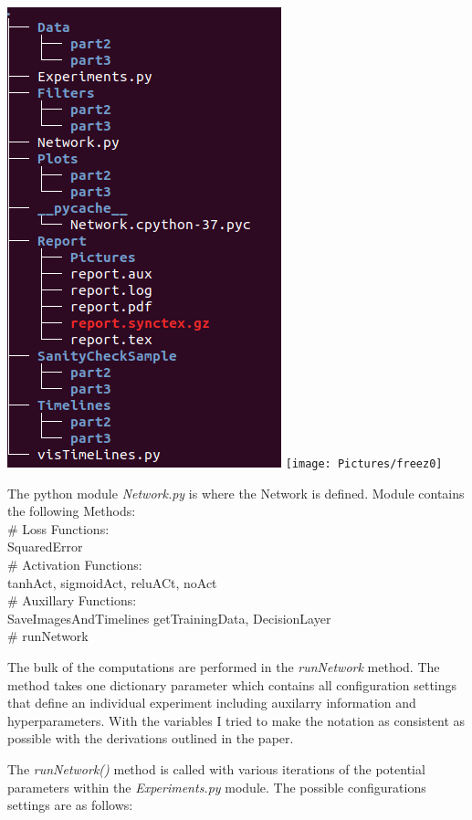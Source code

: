 \documentclass{article}
\begin{document}
\includegraphics[scale=.5]{Pictures/Tree.png}
\texttt{[image: Pictures/freez0]}

The python module {\it Network.py} is where the Network is defined. Module contains the following Methods:\\
\# Loss Functions:\\
SquaredError\\
\# Activation Functions:\\
 tanhAct, sigmoidAct, reluACt, noAct\\
\# Auxillary Functions:\\
 SaveImagesAndTimelines
 getTrainingData, DecisionLayer\\
\# runNetwork 

The bulk of the computations are performed in the {\it runNetwork} method.   The method takes one dictionary parameter which contains all configuration settings that define an individual experiment including auxilarry information and hyperparameters. With the variables I tried to make the notation as consistent as possible with the derivations outlined in the paper. 

The {\it runNetwork()} method is called with various iterations of the potential parameters within the {\it Experiments.py} module. 
The possible configurations settings are as follows:
\end{document}
